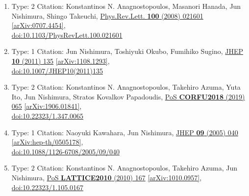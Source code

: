 \documentclass[a4paper,10pt]{article}
\begin{document}
\begin{enumerate}
\begin{enumerate}
  \item Type: 2 Citation: Konstantinos N. Anagnostopoulos, Masanori Hanada, Jun Nishimura, Shingo Takeuchi, \href{https://www.doi.org/10.1103/PhysRevLett.100.021601}{Phys.Rev.Lett. {\bf 100} (2008) 021601}  \href{https://arxiv.org/abs/0707.4454}{[arXiv:0707.4454]},\\\href{https://www.doi.org/10.1103/PhysRevLett.100.021601}{doi:10.1103/PhysRevLett.100.021601}
  \item Type: 1 Citation: Jun Nishimura, Toshiyuki Okubo, Fumihiko Sugino, \href{https://www.doi.org/10.1007/JHEP10(2011)135}{JHEP {\bf 10} (2011) 135}  \href{https://arxiv.org/abs/1108.1293}{[arXiv:1108.1293]},\\\href{https://www.doi.org/10.1007/JHEP10(2011)135}{doi:10.1007/JHEP10(2011)135}
  \item Type: 2 Citation: Konstantinos N. Anagnostopoulos, Takehiro Azuma, Yuta Ito, Jun Nishimura, Stratos Kovalkov Papadoudis, \href{https://www.doi.org/10.22323/1.347.0065}{PoS {\bf CORFU2018} (2019) 065}  \href{https://arxiv.org/abs/1906.01841}{[arXiv:1906.01841]},\\\href{https://www.doi.org/10.22323/1.347.0065}{doi:10.22323/1.347.0065}
  \item Type: 1 Citation: Naoyuki Kawahara, Jun Nishimura, \href{https://www.doi.org/10.1088/1126-6708/2005/09/040}{JHEP {\bf 09} (2005) 040}  \href{https://arxiv.org/abs/hep-th/0505178}{[arXiv:hep-th/0505178]},\\\href{https://www.doi.org/10.1088/1126-6708/2005/09/040}{doi:10.1088/1126-6708/2005/09/040}
  \item Type: 2 Citation: Konstantinos N. Anagnostopoulos, Takehiro Azuma, Jun Nishimura, \href{https://www.doi.org/10.22323/1.105.0167}{PoS {\bf LATTICE2010} (2010) 167}  \href{https://arxiv.org/abs/1010.0957}{[arXiv:1010.0957]},\\\href{https://www.doi.org/10.22323/1.105.0167}{doi:10.22323/1.105.0167}

\end{enumerate}
\end{enumerate}
\end{document}
